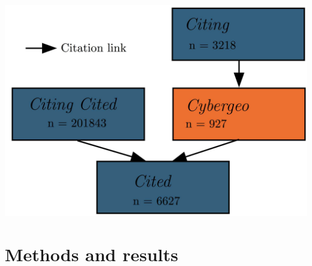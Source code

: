 {\bigskip

\centering

\includegraphics[width=0.7\linewidth]{figures/Fig2.jpg}

}


\section{Methods and results}


